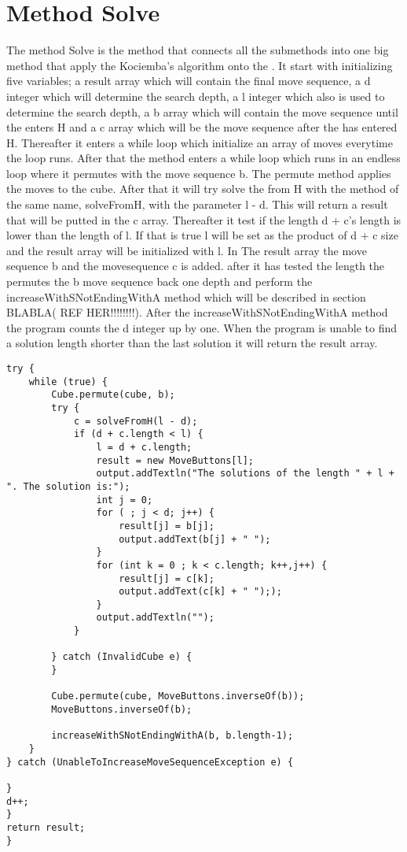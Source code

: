 \section{Method Solve}

The method Solve is the method that connects all the submethods into one big method that apply the Kociemba's algorithm onto the \rubik{}. It start with initializing five variables; a result array which will contain the final move sequence, a d integer which will determine the search depth, a l integer which also is used to determine the search depth, a b array which will contain the move sequence until the \rubik{} enters H and a c array which will be the move sequence after the \rubik{} has entered H. Thereafter it enters a while loop which initialize an array of moves everytime the loop runs. After that the method enters a while loop which runs in an endless loop where it permutes with the move sequence b. The permute method applies the moves to the cube. After that it will try solve the \rubik{} from H with the method of the same name, solveFromH, with the parameter l - d.  This will return a result that will be putted in the c array. Thereafter it test if the length d + c's length is lower than the length of l. If that is true  l will be set as the product of d + c size and the result array will be initialized with l. In The result array the move sequence b and the movesequence c is added. after it has tested the length the \rubik{}  permutes the b move sequence back one depth and perform the increaseWithSNotEndingWithA method which will be described in section BLABLA( REF HER!!!!!!!!). After the increaseWithSNotEndingWithA method the program counts the d integer up by one. When the program is unable to find a solution length shorter than the last solution it will return the result array.


\begin{verbatim}
try {
	while (true) {
		Cube.permute(cube, b);
		try {
			c = solveFromH(l - d);
			if (d + c.length < l) {
				l = d + c.length;
				result = new MoveButtons[l];
				output.addTextln("The solutions of the length " + l + ". The solution is:");
				int j = 0;
				for ( ; j < d; j++) {
					result[j] = b[j];
					output.addText(b[j] + " ");
				} 
				for (int k = 0 ; k < c.length; k++,j++) {
					result[j] = c[k];
					output.addText(c[k] + " "););
				}
				output.addTextln("");
			}

		} catch (InvalidCube e) {
		}

		Cube.permute(cube, MoveButtons.inverseOf(b));
		MoveButtons.inverseOf(b);					

		increaseWithSNotEndingWithA(b, b.length-1);
	}
} catch (UnableToIncreaseMoveSequenceException e) {

}
d++;
}
return result;
}
\end{verbatim}